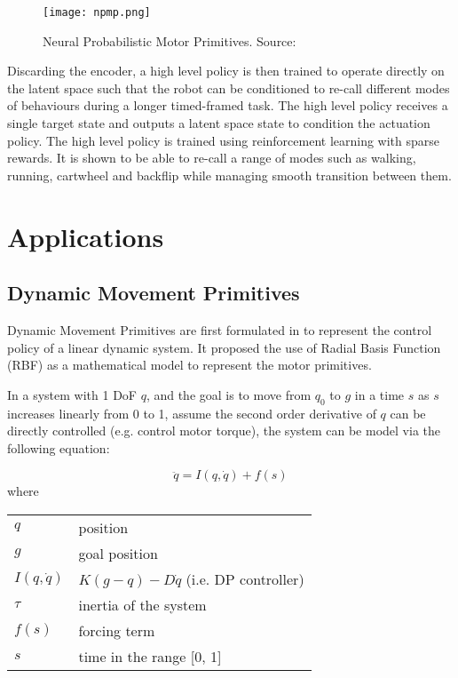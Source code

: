 \documentclass[conference]{IEEEtran}
\makeatletter
\newenvironment{conditions}
  {\par\vspace{\abovedisplayskip}\noindent\begin{tabular}{>{$}l<{$} @{${}={}$} l}}
  {\end{tabular}\par\vspace{\belowdisplayskip}}
\makeatother
\begin{document}
\begin{figure}
    \centering
    \texttt{[image: npmp.png]}
    \caption{Neural Probabilistic Motor Primitives. Source: \cite{merelNeuralProbabilisticMotor2019}}
    \label{fig:npmp}
\end{figure}

Discarding the encoder, a high level policy is then trained to operate directly on the latent space such that the robot can be conditioned to re-call different modes of behaviours during a longer timed-framed task. The high level policy receives a single target state and outputs a latent space state to condition the actuation policy. The high level policy is trained using reinforcement learning with sparse rewards. It is shown to be able to re-call a range of modes such as walking, running, cartwheel and backflip while managing smooth transition between them.

\section{Applications}

\subsection{Dynamic Movement Primitives}

Dynamic Movement Primitives are first formulated in \cite{ijspeertTrajectoryFormationImitation2001} to represent the control policy of a linear dynamic system. It proposed the use of Radial Basis Function (RBF) as a mathematical model to represent the motor primitives. 

In a system with 1 DoF $q$, and the goal is to move from $q_0$ to $g$ in a time $s$ as $s$ increases linearly from 0 to 1, assume the second order derivative of $q$ can be directly controlled (e.g. control motor torque), the system can be model via the following equation:

\begin{equation}
    \ddot{q} = I(q, \dot{q})  + f(s)
\end{equation}
where
\begin{conditions}
    q & position \\
    g & goal position \\
    I(q,\dot{q}) & \(K(g-q) - D\dot{q}\) (i.e. DP controller) \\
    \tau & inertia of the system \\
    f(s) & forcing term \\
    s & time in the range [0, 1] \\
\end{conditions}
\end{document}
